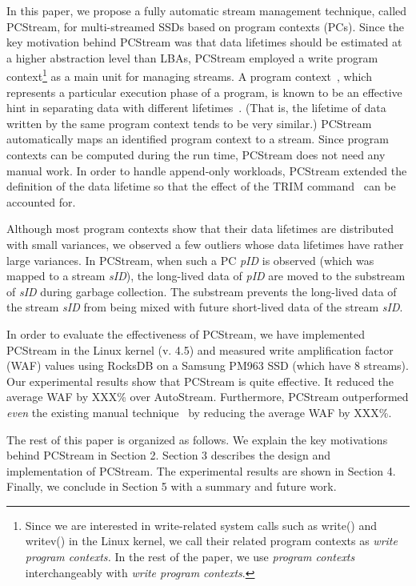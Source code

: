 In this paper, we propose a fully automatic stream management technique, called {\sf PCStream}, 
for multi-streamed SSDs based on program contexts (PCs).
Since the key motivation behind {\sf PCStream} was 
that data lifetimes should be estimated at a higher abstraction level than LBAs, 
{\sf PCStream} employed a write program context\footnote{Since we are interested in write-related 
system calls such as write() and writev() in the Linux kernel, 
we call their related program contexts as 
{\it write program contexts.} In the rest of the paper, we use 
{\it program contexts} interchangeably with {\it write program contexts}.}  
as a main unit for managing streams.   
A program context~\cite{PC}, which represents a particular execution phase of a program, 
is known to be an effective hint in separating data with different lifetimes~\cite{PCHa}.  
(That is, the lifetime of data written by the same program context tends to be very similar.)   
{\sf PCStream} automatically maps an identified program context to a stream.  
Since program contexts can be computed during the run time, 
{\sf PCStream} does not need any manual work.   
In order to handle append-only workloads, 
{\sf PCStream} extended the definition of the data lifetime 
so that the effect of the TRIM command~\cite{10} can be accounted for. 

Although most program contexts show that their data lifetimes are 
distributed with small variances, we observed a few outliers 
whose data lifetimes have rather large variances.
In {\sf PCStream}, 
when such a PC {\it pID} is observed (which was mapped to a stream {\it sID}), 
the long-lived data of {\it pID} are moved to the substream of {\it sID}
during garbage collection.  
The substream prevents the long-lived data of the stream {\it sID} 
from being mixed with future short-lived data of the stream {\it sID}.

In order to evaluate the effectiveness of PCStream, we have implemented PCStream 
in the Linux kernel (v. 4.5) and measured write amplification factor (WAF) values 
using RocksDB on a Samsung PM963 SSD (which have 8 streams).  
Our experimental results show that {\sf PCStream} is quite effective.  
It reduced the average WAF by XXX\% over AutoStream.  
Furthermore, PCStream outperformed {\it even} the existing manual technique~\cite{MultiStream} 
by reducing the average WAF by XXX\%.

The rest of this paper is organized as follows. 
We explain the key motivations behind {\sf PCStream} in Section 2. 
Section 3 describes 
the design and implementation of {\sf PCStream}.
The experimental results are shown in Section 4. 
Finally, we conclude in Section 5 with a summary and future work. 

